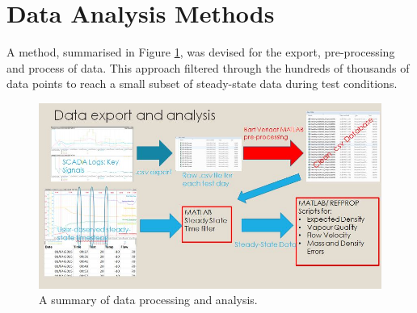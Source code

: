 \documentclass{report}
\begin{document}
\section{Data Analysis Methods} \label{analysis}
A method, summarised in Figure \ref{fig:processing}, was devised for the export, pre-processing and process of data. This approach filtered through the hundreds of thousands of data points to reach a small subset of steady-state data during test conditions. 

\begin{figure}
\includegraphics[width=\textwidth]{processing}
\caption{A summary of data processing and analysis.}
\label{fig:processing}
\end{figure}
\end{document}
